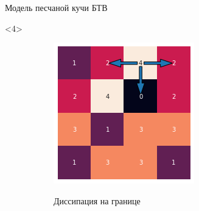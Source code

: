 \documentclass{beamer}
\begin{document}
\begin{frame}{Модель песчаной кучи БТВ}
		\begin{onlyenv}<4>
			\begin{figure}[ht]
				\centering
				\begin{subfigure}{0.45\textwidth}
					\includegraphics[width=\linewidth]{slides/btw_3}
				\end{subfigure}
				\begin{subfigure}{0.45\textwidth}
					Диссипация на границе
				\end{subfigure}
			\end{figure}
		\end{onlyenv}
	

\end{frame}
\end{document}
